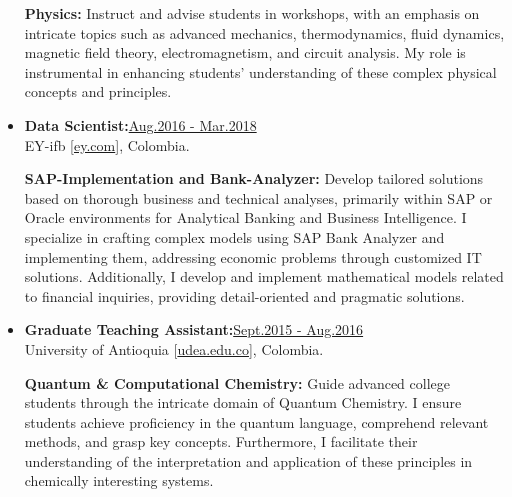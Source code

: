 \begin{itemize}
              {\noindent
                  \textbf{Physics:}
                  Instruct and advise students in workshops, with an emphasis on intricate topics such as advanced mechanics, thermodynamics, fluid dynamics, magnetic field theory, electromagnetism, and circuit analysis. My role is instrumental in enhancing students' understanding of these complex physical concepts and principles.
              }



    \item {\bf Data Scientist:}\hfill \href{.}{Aug.2016 - Mar.2018}\\
          EY-ifb [\href{www.ey.com/en\_gl/ey-ifb}{ey.com}],
          Colombia.

              {\noindent
                  \textbf{SAP-Implementation and Bank-Analyzer:}
                  Develop tailored solutions based on thorough business and technical analyses, primarily within SAP or Oracle environments for Analytical Banking and Business Intelligence. I specialize in crafting complex models using SAP Bank Analyzer and implementing them, addressing economic problems through customized IT solutions. Additionally, I develop and implement mathematical models related to financial inquiries, providing detail-oriented and pragmatic solutions.
              }

    \item {\bf Graduate Teaching Assistant:}\hfill \href{.}{Sept.2015 - Aug.2016}\\
          University of Antioquia [\href{www.udea.edu.co}{udea.edu.co}],
          Colombia.

              {\noindent
                  \textbf{Quantum \& Computational Chemistry:}
                  Guide advanced college students through the intricate domain of Quantum Chemistry. I ensure students achieve proficiency in the quantum language, comprehend relevant methods, and grasp key concepts. Furthermore, I facilitate their understanding of the interpretation and application of these principles in chemically interesting systems.
              }

\end{itemize}
